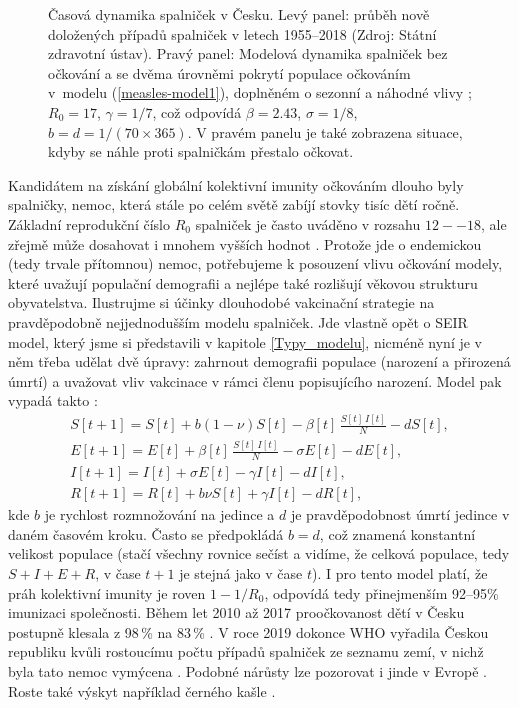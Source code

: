 \begin{figure}[h]
\begin{center}
\begin{minipage}[m]{0.45\linewidth}
		\end{minipage}
	\end{center}
	\caption{Časová dynamika spalniček v Česku. Levý panel: průběh nově doložených případů spalniček v letech 1955--2018 (Zdroj: Státní zdravotní ústav). Pravý panel: Modelová dynamika spalniček bez očkování a se dvěma úrovněmi pokrytí populace očkováním v~modelu (\ref{measles-model1}), doplněném o sezonní a náhodné vlivy \cite{KeelingRohani2008}; $R_0=17$, $\gamma=1/7$, což odpovídá $\beta=2.43$, $\sigma=1/8$, $b=d=1/(70\times365)$. V pravém panelu je také zobrazena situace, kdyby se náhle proti spalničkám přestalo očkovat.}
	\label{measles1}
\end{figure}

Kandidátem na získání globální kolektivní imunity očkováním dlouho byly spalničky, nemoc, která stále po celém světě zabíjí stovky tisíc dětí ročně. Základní reprodukční číslo $R_0$ spalniček je často uváděno v rozsahu $12--18$, ale zřejmě může dosahovat i mnohem vyšších hodnot \cite{Guerra_etal2017}. Protože jde o endemickou (tedy trvale přítomnou) nemoc, potřebujeme k posouzení vlivu očkování modely, které uvažují populační demografii a nejlépe také rozlišují věkovou strukturu obyvatelstva. Ilustrujme si účinky dlouhodobé vakcinační strategie na pravděpodobně nejjednodušším modelu spalniček. Jde vlastně opět o SEIR model, který jsme si představili v kapitole \ref{Typy_modelu}, nicméně nyní je v něm třeba udělat dvě úpravy: zahrnout demografii populace (narození a přirozená úmrtí) a uvažovat vliv vakcinace v rámci členu popisujícího narození. Model pak vypadá takto \cite{BolkerGrenfell1993}:
\begin{equation}
	\begin{array}{l}
		\displaystyle{S[t+1] = S[t] + b (1-\nu) S[t] - \beta[t] \, \frac{S[t]\,I[t]}{N} - d S[t]}, \\[3ex]
		\displaystyle{E[t+1] = E[t] + \beta[t] \, \frac{S[t]\,I[t]}{N} - \sigma E[t] - d E[t]}, \\[3ex]
		\displaystyle{I[t+1] = I[t] + \sigma E[t] - \gamma I[t] - d I[t]}, \\[3ex]
		\displaystyle{R[t+1] = R[t] + b \nu S[t] + \gamma I[t] - d R[t]},
	\end{array}
	\label{measles-model1}
\end{equation}
kde $b$ je rychlost rozmnožování na jedince a $d$ je pravděpodobnost úmrtí jedince v daném časovém kroku. Často se předpokládá $b=d$, což znamená konstantní velikost populace (stačí všechny rovnice sečíst a vidíme, že celková populace, tedy $S+I+E+R$, v čase $t+1$ je stejná jako v čase $t$). I pro tento model platí, že práh kolektivní imunity je roven $1-1/R_0$, odpovídá tedy přinejmenším 92--95\% imunizaci společnosti. Během let 2010 až 2017 proočkovanost dětí v Česku postupně klesala z 98\,\% na 83\,\% \cite{spavac}. V roce 2019 dokonce WHO vyřadila Českou republiku kvůli rostoucímu počtu případů spalniček ze seznamu zemí, v nichž byla tato nemoc vymýcena \cite{spaend}. Podobné nárůsty lze pozorovat i jinde v Evropě \cite{Thornton2019}. Roste také výskyt například černého kašle \cite{Lavine_etal2011}. 

